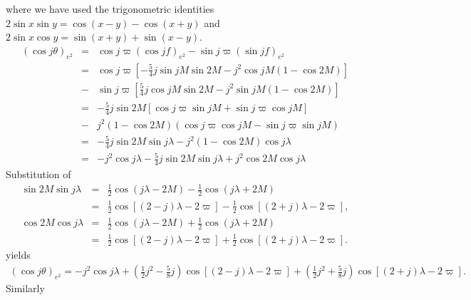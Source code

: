 \documentclass [12pt, a4paper] {article}
\begin{document}
where we have used the trigonometric identities  
$2\sin x\sin y = \cos(x - y) - \cos(x+y)$ and $2\sin x\cos y = \sin(x + y) + \sin(x - y)$.
\begin {eqnarray}
    (\cos j\theta)_{e^2}
    &=&
    \cos j\varpi(\cos jf)_{e^2} - \sin j\varpi(\sin jf)_{e^2}
    \\
    &=&
    \cos j\varpi
    \left[
         -\frac{5}{4}j\sin jM\sin 2M - j^2\cos jM(1 - \cos 2M)
    \right]
    \\\nonumber 
    &-&
    \sin j\varpi
    \left[
        \frac{5}{4}j\cos jM\sin 2M 
        -
        j^2\sin jM 
        \left(
            1 - \cos 2M
        \right)
    \right]
    \\
    &=&
    -\frac{5}{4}j\sin 2M 
    \left[
        \cos j\varpi \sin jM 
        + 
        \sin j\varpi\cos jM
    \right]
    \\\nonumber 
    &-& 
    j^2\left(1 - \cos 2M\right)
    \left(
        \cos j\varpi\cos jM - \sin j\varpi\sin jM
    \right)
    \\
    &=& 
    -\frac{5}{4}j\sin 2M\sin j\lambda - j^2(1 - \cos 2M)\cos j\lambda 
    \\
    &=& 
    - j^2\cos j\lambda -\frac{5}{4}j\sin 2M\sin j\lambda + j^2\cos 2M\cos j\lambda 
\end {eqnarray}
Substitution of 
\begin {eqnarray}
    \sin 2M\sin j\lambda 
    &=& 
    \frac{1}{2}\cos(j\lambda - 2M) 
    -
    \frac{1}{2}\cos(j\lambda + 2M)
    \\
    &=& 
    \frac{1}{2}\cos[(2 - j)\lambda - 2\varpi] 
    -
    \frac{1}{2}\cos[(2 + j)\lambda - 2\varpi],
    \\
    \cos 2M\cos j\lambda 
    &=& 
    \frac{1}{2}\cos(j\lambda - 2M) 
    + 
    \frac{1}{2}\cos(j\lambda + 2M)
    \\
    &=& 
    \frac{1}{2}\cos[(2 - j)\lambda - 2\varpi] 
    + 
    \frac{1}{2}\cos[(2 + j)\lambda - 2\varpi].
\end {eqnarray}
yields 
\begin {eqnarray}
    (\cos j\theta)_{e^2}
    =
    -
    j^2\cos j\lambda
    +
    \left(
        \frac{1}{2}j^2 - \frac{5}{8}j
    \right)
    \cos[(2 - j)\lambda - 2\varpi]
    +
    \left(
        \frac{1}{2}j^2 + \frac{5}{8}j
    \right)
    \cos[(2 + j)\lambda - 2\varpi].
\end {eqnarray}
Similarly 
\end{document}
